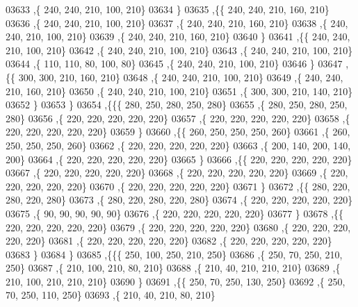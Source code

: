 \begin{DoxyCode}
03633     ,\{   240,   240,   210,   100,   210\}
03634     \}
03635    ,\{\{   240,   240,   210,   160,   210\}
03636     ,\{   240,   240,   210,   100,   210\}
03637     ,\{   240,   240,   210,   160,   210\}
03638     ,\{   240,   240,   210,   100,   210\}
03639     ,\{   240,   240,   210,   160,   210\}
03640     \}
03641    ,\{\{   240,   240,   210,   100,   210\}
03642     ,\{   240,   240,   210,   100,   210\}
03643     ,\{   240,   240,   210,   100,   210\}
03644     ,\{   110,   110,    80,   100,    80\}
03645     ,\{   240,   240,   210,   100,   210\}
03646     \}
03647    ,\{\{   300,   300,   210,   160,   210\}
03648     ,\{   240,   240,   210,   100,   210\}
03649     ,\{   240,   240,   210,   160,   210\}
03650     ,\{   240,   240,   210,   100,   210\}
03651     ,\{   300,   300,   210,   140,   210\}
03652     \}
03653    \}
03654   ,\{\{\{   280,   250,   280,   250,   280\}
03655     ,\{   280,   250,   280,   250,   280\}
03656     ,\{   220,   220,   220,   220,   220\}
03657     ,\{   220,   220,   220,   220,   220\}
03658     ,\{   220,   220,   220,   220,   220\}
03659     \}
03660    ,\{\{   260,   250,   250,   250,   260\}
03661     ,\{   260,   250,   250,   250,   260\}
03662     ,\{   220,   220,   220,   220,   220\}
03663     ,\{   200,   140,   200,   140,   200\}
03664     ,\{   220,   220,   220,   220,   220\}
03665     \}
03666    ,\{\{   220,   220,   220,   220,   220\}
03667     ,\{   220,   220,   220,   220,   220\}
03668     ,\{   220,   220,   220,   220,   220\}
03669     ,\{   220,   220,   220,   220,   220\}
03670     ,\{   220,   220,   220,   220,   220\}
03671     \}
03672    ,\{\{   280,   220,   280,   220,   280\}
03673     ,\{   280,   220,   280,   220,   280\}
03674     ,\{   220,   220,   220,   220,   220\}
03675     ,\{    90,    90,    90,    90,    90\}
03676     ,\{   220,   220,   220,   220,   220\}
03677     \}
03678    ,\{\{   220,   220,   220,   220,   220\}
03679     ,\{   220,   220,   220,   220,   220\}
03680     ,\{   220,   220,   220,   220,   220\}
03681     ,\{   220,   220,   220,   220,   220\}
03682     ,\{   220,   220,   220,   220,   220\}
03683     \}
03684    \}
03685   ,\{\{\{   250,   100,   250,   210,   250\}
03686     ,\{   250,    70,   250,   210,   250\}
03687     ,\{   210,   100,   210,    80,   210\}
03688     ,\{   210,    40,   210,   210,   210\}
03689     ,\{   210,   100,   210,   210,   210\}
03690     \}
03691    ,\{\{   250,    70,   250,   130,   250\}
03692     ,\{   250,    70,   250,   110,   250\}
03693     ,\{   210,    40,   210,    80,   210\}

\end{DoxyCode}
